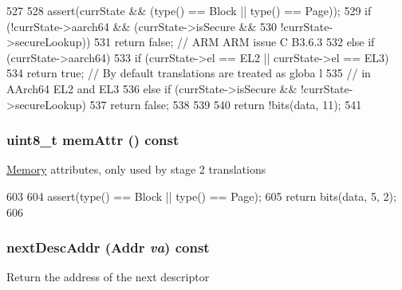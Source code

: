 \begin{DoxyCode}
527         {
528             assert(currState && (type() == Block || type() == Page));
529             if (!currState->aarch64 && (currState->isSecure &&
530                                         !currState->secureLookup)) {
531                 return false;  // ARM ARM issue C B3.6.3
532             } else if (currState->aarch64) {
533                 if (currState->el == EL2 || currState->el == EL3) {
534                     return true;  // By default translations are treated as globa
      l
535                                   // in AArch64 EL2 and EL3
536                 } else if (currState->isSecure && !currState->secureLookup) {
537                     return false;
538                 }
539             }
540             return !bits(data, 11);
541         }
\end{DoxyCode}
\hypertarget{classArmISA_1_1TableWalker_1_1LongDescriptor_a2f2b83b47e2b95cea95fef8964ccb96e}{
\subsubsection[{memAttr}]{\setlength{\rightskip}{0pt plus 5cm}uint8\_\-t memAttr () const}}
\label{classArmISA_1_1TableWalker_1_1LongDescriptor_a2f2b83b47e2b95cea95fef8964ccb96e}
\hyperlink{classArmISA_1_1Memory}{Memory} attributes, only used by stage 2 translations 


\begin{DoxyCode}
603         {
604             assert(type() == Block || type() == Page);
605             return bits(data, 5, 2);
606         }
\end{DoxyCode}
\hypertarget{classArmISA_1_1TableWalker_1_1LongDescriptor_a0464bb8a36a7df5b95a949f1cdb5d68c}{
\subsubsection[{nextDescAddr}]{ nextDescAddr ({\bf Addr} {\em va}) const}}
\label{classArmISA_1_1TableWalker_1_1LongDescriptor_a0464bb8a36a7df5b95a949f1cdb5d68c}
Return the address of the next descriptor 


